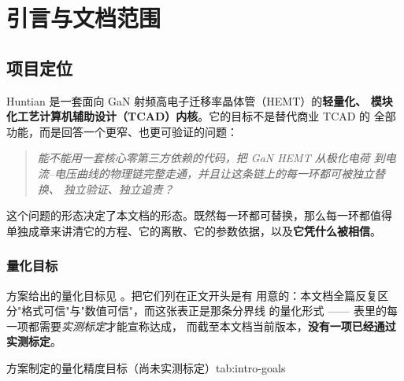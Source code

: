 
\chapter{引言与文档范围}
\label{ch:intro}

\section{项目定位}

Huntian 是一套面向 GaN 射频高电子迁移率晶体管（HEMT）的\textbf{轻量化、
模块化工艺计算机辅助设计（TCAD）内核}。它的目标不是替代商业 TCAD 的
全部功能，而是回答一个更窄、也更可验证的问题：

\begin{quote}
\emph{能不能用一套\emph{核心零第三方依赖}的代码，把 GaN HEMT 从极化电荷
到电流--电压曲线的物理链完整走通，并且让这条链上的每一环都可被独立替换、
独立验证、独立追责？}
\end{quote}

这个问题的形态决定了本文档的形态。既然每一环都可替换，那么每一环都值得
单独成章来讲清它的方程、它的离散、它的参数依据，以及\textbf{它凭什么被相信}。

\subsection{量化目标}

方案给出的量化目标见 。把它们列在正文开头是有
用意的：本文档全篇反复区分"格式可信"与"数值可信"，而这张表正是那条分界线
的量化形式 —— 表里的每一项都需要\emph{实测标定}才能宣称达成，
而截至本文档当前版本，\textbf{没有一项已经通过实测标定}。

\begin{veriftable}{方案制定的量化精度目标（尚未实测标定）}{tab:intro-goals}
\end{veriftable}

